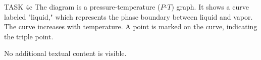 TASK 4c  
The diagram is a pressure-temperature (\(P\)-\(T\)) graph. It shows a curve labeled "liquid," which represents the phase boundary between liquid and vapor. The curve increases with temperature. A point is marked on the curve, indicating the triple point.  

No additional textual content is visible.